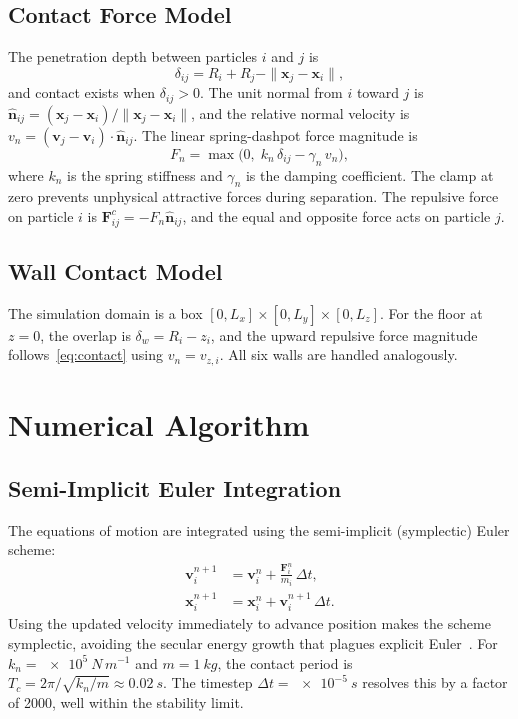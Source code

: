 \documentclass[10pt,twocolumn]{article}
\begin{document}
\subsection{Contact Force Model}

The penetration depth between particles $i$ and $j$ is
\begin{equation}
  \delta_{ij} = R_i + R_j - \|\mathbf{x}_j - \mathbf{x}_i\|,
\end{equation}
and contact exists when $\delta_{ij} > 0$.
The unit normal from $i$ toward $j$ is
$\hat{\mathbf{n}}_{ij} = (\mathbf{x}_j-\mathbf{x}_i)/\|\mathbf{x}_j-\mathbf{x}_i\|$,
and the relative normal velocity is
$v_n = (\mathbf{v}_j - \mathbf{v}_i)\cdot\hat{\mathbf{n}}_{ij}$.
The linear spring-dashpot force magnitude is
\begin{equation}
  F_n = \max\!\bigl(0,\; k_n\,\delta_{ij} - \gamma_n\,v_n\bigr),
  \label{eq:contact}
\end{equation}
where $k_n$ is the spring stiffness and $\gamma_n$ is the damping
coefficient.
The clamp at zero prevents unphysical attractive forces during separation.
The repulsive force on particle $i$ is
$\mathbf{F}_{ij}^c = -F_n\hat{\mathbf{n}}_{ij}$,
and the equal and opposite force acts on particle $j$.

\subsection{Wall Contact Model}

The simulation domain is a box $[0,L_x]\times[0,L_y]\times[0,L_z]$.
For the floor at $z=0$, the overlap is $\delta_w = R_i - z_i$, and the
upward repulsive force magnitude follows~\eqref{eq:contact} using
$v_n = v_{z,i}$.
All six walls are handled analogously.

\section{Numerical Algorithm}

\subsection{Semi-Implicit Euler Integration}

The equations of motion are integrated using the semi-implicit (symplectic)
Euler scheme:
\begin{align}
  \mathbf{v}_i^{n+1} &= \mathbf{v}_i^n
    + \frac{\mathbf{F}_i^n}{m_i}\,\Delta t, \label{eq:vel}\\[2pt]
  \mathbf{x}_i^{n+1} &= \mathbf{x}_i^n
    + \mathbf{v}_i^{n+1}\,\Delta t. \label{eq:pos}
\end{align}
Using the updated velocity immediately to advance position makes the scheme
symplectic, avoiding the secular energy growth that plagues explicit
Euler~\cite{Hairer2006}.
For $k_n = \SI{e5}{N\,m^{-1}}$ and $m = \SI{1}{kg}$, the contact period is
$T_c = 2\pi/\sqrt{k_n/m} \approx \SI{0.02}{s}$.
The timestep $\Delta t = \SI{e-5}{s}$ resolves this by a factor of 2000,
well within the stability limit.
\end{document}
